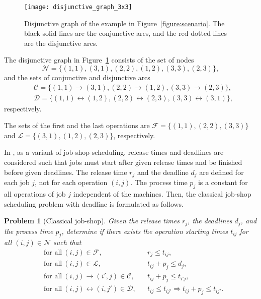 \documentclass{sig-alternate}
\newtheorem{problem}{Problem}
\begin{document}
\begin{figure}[t]
	\centering
	\texttt{[image: disjunctive\_graph\_3x3]}
	\caption{Disjunctive graph of the example in Figure~\ref{figure:scenario}. The black solid lines are the conjunctive arcs, and the red dotted lines are the disjunctive arcs.}
	\label{figure:disjunctiveGraph}
\end{figure}

\begin{example}
	The disjunctive graph in Figure~\ref{figure:disjunctiveGraph} consists of the set of nodes $$\mathcal{N} = \{(1,1),(3,1),(2,2),(1,2),(3,3),(2,3)\},$$ and the sets of conjunctive and disjunctive arcs\begin{align*}
		&\mathcal{C}=\{(1,1)\rightarrow(3,1), (2,2)\rightarrow(1,2), (3,3)\rightarrow(2,3)\},\\
		&\mathcal{D}=\{(1,1)\leftrightarrow(1,2),  (2,2)\leftrightarrow(2,3),(3,3)\leftrightarrow(3,1)\},
	\end{align*}
	respectively. 
	
	The sets of the first and the last operations are 	$\mathcal{F}=\{(1,1),(2,2),(3,3)\}$ and $\mathcal{L}=\{(3,1),(1,2),(2,3)\}$, respectively.
	
\end{example}


In \cite{balas_job_1998}, as a variant of job-shop scheduling, release times and deadlines are considered such that jobs must start after given release times and be finished before given deadlines. The release time $r_j$ and the deadline $d_j$ are defined for each job $j$, not for each operation $(i,j)$. The process time $p_j$ is a constant for all operations of job $j$ independent of the machines. Then, the classical job-shop scheduling problem with deadline is formulated as follows.
\begin{problem}[Classical job-shop]\label{problem:classical_jobshop}
	Given the release times $r_j$, the deadlines $d_j$, and the process time $p_j$, determine if there exists the operation starting times $t_{ij}$ for all $(i,j)\in\mathcal{N}$ such that
	\begin{align*}
		&\text{for all}~ (i,j)\in\mathcal{F}, && r_{j}\leq t_{ij},\\
		&\text{for all}~ (i,j)\in\mathcal{L}, && t_{ij}+p_{j}\leq d_{j},\\
		&\text{for all}~ (i,j)\rightarrow (i',j)\in\mathcal{C}, && t_{ij}+p_{j}\leq t_{i'j},\\
		&\text{for all}~ (i,j)\leftrightarrow (i,j')\in\mathcal{D}, && t_{ij}\leq t_{ij'}\Rightarrow t_{ij}+p_j\leq t_{ij'}.
	\end{align*}
\end{problem}
\end{document}
